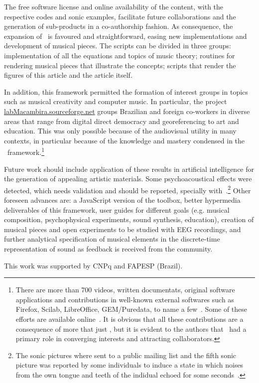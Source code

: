 The free software license and online availability of the content,
with the respective codes and sonic examples, facilitate future collaborations and the generation of sub-products in a co-authorship fashion.
As consequence, the expansion of \massa\ is favoured and straightforward, easing new implementations and development of musical pieces.
The scripts can be divided in three groups: implementation of all the equations and topics of music theory; routines for rendering musical pieces that illustrate the concepts; scripts that render the figures of this article and the article itself.

In addition, this framework permitted the formation of interest groups in topics such as musical creativity and computer music.
In particular, the project \url{labMacambira.sourceforge.net} groups Brazilian and foreign co-workers
in diverse areas that range from digital direct democracy and georeferencing to art and education.
This was only possible because of the audiovisual utility in many contexts, in particular because of the knowledge and mastery condensed in the \massa\ framework.\footnote{There are more than 700 videos, written documentats,
 original software applications and contributions in well-known external softwares such as Firefox, Scilab, LibreOffice, GEM/Puredata, to name a few~\cite{siteLM,wikiLM,vimeoLM}.
Some of these efforts are available online~\cite{dissertacao}.
It is obvious that all these contributions are a consequence of more that just \massa, but it is evident to the authors that \massa\ had a primary role in converging interests and attracting collaborators.}

Future work should include application of these results in artificial intelligence
for the generation of appealing artistic materials. Some psychoacoustical effects were detected,
which needs validation and should be reported, specially with~\cite{quadrosSonoros}.\footnote{The sonic pictures where sent to a public mailing list and the fifth sonic picture was reported by some individuals to induce a state in which noises from the own tongue and teeth of the indidual echoed for some seconds~\cite{quadrosMetarec}.} Other foreseen advances
are: a JavaScript version of the toolbox, better hypermedia deliverables of this framework, user guides
for different goals (e.g. musical composition, psychophysical experiments, sound synthesis, education), creation
of musical pieces and open experiments to be studied with EEG recordings, and further analytical specification of musical
elements in the discrete-time representation of sound as feedback is received from the community.

\begin{acks}
This work was supported by CNPq and FAPESP (Brazil).
\end{acks}


% 

